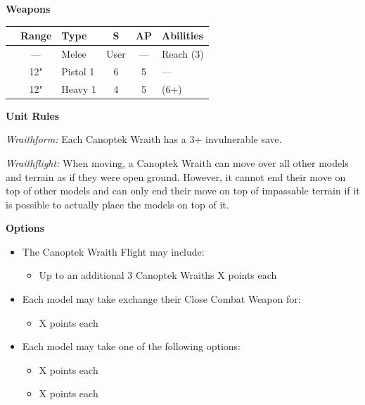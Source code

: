 \begin{minipage}[t]{0.72\textwidth}
	\vspace*{2em}
	\textbf{Weapons}
	
	\begin{tabular}{L{90 pt} c C{40pt} *{2}{c} >{\raggedright\arraybackslash}p{130pt}}
		& Range & Type & S & AP & Abilities \\
		\hline
		 & — & Melee & User & — & Reach (3) \\
		 & 12" & Pistol 1 & 6 & 5 & — \\
		 & 12" & Heavy 1 & 4 & 5 &  (6+) \\
	\end{tabular}
	
	\vspace*{2em}
	\textbf{Unit Rules}
	
	\textit{Wraithform:} Each Canoptek Wraith has a 3+ invulnerable save.
	
	\textit{Wraithflight:} When moving, a Canoptek Wraith can move over all other models and terrain as if they were open ground. However, it cannot end their move on top of other models and can only end their move on top of impassable terrain if it is possible to actually place the models on top of it.	
	
	\vspace*{2em}
	\textbf{Options}
	\begin{itemize}
		\item The Canoptek Wraith Flight may include:
		\begin{itemize}
			\item Up to an additional 3 Canoptek Wraiths \dotfill X points each
		\end{itemize}
		\item Each model may take exchange their Close Combat Weapon for:
		\begin{itemize}
			\item {} \dotfill X points each
		\end{itemize}
		\item Each model may take one of the following options:
		\begin{itemize}
			\item {} \dotfill X points each
			\item {} \dotfill X points each
		\end{itemize}
	\end{itemize}
\end{minipage}


